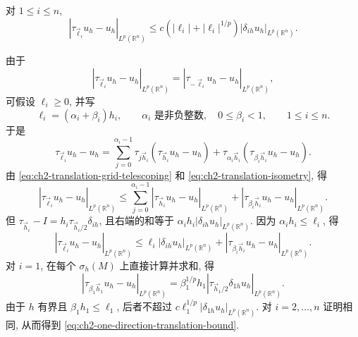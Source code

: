\begin{Lemma}
\label{lem:ch2-one-direction-translation}
对 $1\leq i\leq n$,
\begin{equation}
|\tau_{\vec\ell_i}u_h-u_h|_{L^p(\mathbb R^n)}
\leq c(|\ell_i|+|\ell_i|^{1/p})
|\delta_{ih}u_h|_{L^p(\mathbb R^n)}.
\label{eq:ch2-one-direction-translation-bound}
\end{equation}
\end{Lemma}

\begin{Proof}
由于
\[
|\tau_{\vec\ell_i}u_h-u_h|_{L^p(\mathbb R^n)}
=|\tau_{-\vec\ell_i}u_h-u_h|_{L^p(\mathbb R^n)},
\]
可假设 $\ell_i\geq0$, 并写
\begin{equation}
\ell_i=(\alpha_i+\beta_i)h_i,
\qquad\alpha_i\text{ 是非负整数},\quad0\leq\beta_i<1,
\qquad1\leq i\leq n.
\label{eq:ch2-translation-grid-decomposition}
\end{equation}
于是
\begin{equation}
\tau_{\vec\ell_i}u_h-u_h
=\sum_{j=0}^{\alpha_i-1}\tau_{j\vec h_i}(\tau_{\vec h_i}u_h-u_h)
+\tau_{\alpha_i\vec h_i}(\tau_{\beta_i\vec h_i}u_h-u_h).
\label{eq:ch2-translation-grid-telescoping}
\end{equation}
由 \eqref{eq:ch2-translation-grid-telescoping} 和 \eqref{eq:ch2-translation-isometry}, 得
\begin{equation}
|\tau_{\vec\ell_i}u_h-u_h|_{L^p(\mathbb R^n)}
\leq\sum_{j=0}^{\alpha_i-1}|\tau_{\vec h_i}u_h-u_h|_{L^p(\mathbb R^n)}
+|\tau_{\beta_i\vec h_i}u_h-u_h|_{L^p(\mathbb R^n)}.
\label{eq:ch2-translation-grid-majoration}
\end{equation}
但 $\tau_{\vec h_i}-I=h_i\tau_{\vec h_i/2}\delta_{ih}$, 且右端的和等于 $\alpha_i h_i|\delta_{ih}u_h|_{L^p(\mathbb R^n)}$. 因为 $\alpha_i h_i\leq\ell_i$, 得
\begin{equation}
|\tau_{\vec\ell_i}u_h-u_h|_{L^p(\mathbb R^n)}
\leq\ell_i|\delta_{ih}u_h|_{L^p(\mathbb R^n)}
+|\tau_{\beta_i\vec h_i}u_h-u_h|_{L^p(\mathbb R^n)}.
\label{eq:ch2-translation-grid-majoration-reduced}
\end{equation}
对 $i=1$, 在每个 $\sigma_h(M)$ 上直接计算并求和, 得
\[
|\tau_{\beta_1\vec h_1}u_h-u_h|_{L^p(\mathbb R^n)}
=\beta_1^{1/p}h_1|\tau_{\vec h_1/2}\delta_{1h}u_h|_{L^p(\mathbb R^n)}.
\]
由于 $h$ 有界且 $\beta_1h_1\leq\ell_1$, 后者不超过 $c\ell_1^{1/p}|\delta_{1h}u_h|_{L^p(\mathbb R^n)}$. 对 $i=2,\ldots,n$ 证明相同, 从而得到 \eqref{eq:ch2-one-direction-translation-bound}.
\end{Proof}

